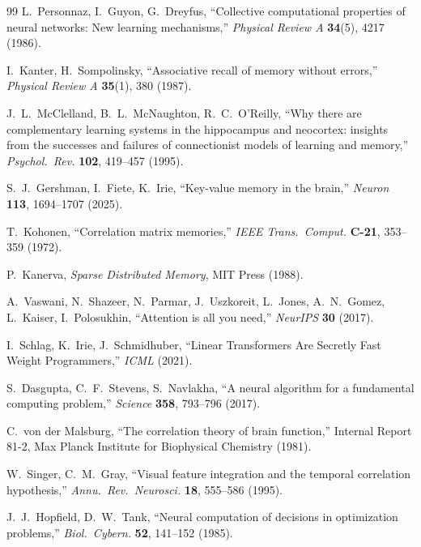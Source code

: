 \documentclass[11pt]{article}
\begin{document}
\begin{thebibliography}{99}
 L.~Personnaz, I.~Guyon, G.~Dreyfus, ``Collective computational
properties of neural networks: New learning mechanisms,'' \textit{Physical Review A}
\textbf{34}(5), 4217 (1986).

 I.~Kanter, H.~Sompolinsky, ``Associative recall of memory without
errors,'' \textit{Physical Review A} \textbf{35}(1), 380 (1987).

 J.~L.~McClelland, B.~L.~McNaughton, R.~C.~O'Reilly, ``Why there are
complementary learning systems in the hippocampus and neocortex: insights from the successes
and failures of connectionist models of learning and memory,'' \textit{Psychol.\ Rev.}
\textbf{102}, 419--457 (1995).

 S.~J.~Gershman, I.~Fiete, K.~Irie, ``Key-value memory in the brain,''
\textit{Neuron} \textbf{113}, 1694--1707 (2025).

 T.~Kohonen, ``Correlation matrix memories,'' \textit{IEEE Trans.\
Comput.} \textbf{C-21}, 353--359 (1972).

 P.~Kanerva, \textit{Sparse Distributed Memory}, MIT Press (1988).

 A.~Vaswani, N.~Shazeer, N.~Parmar, J.~Uszkoreit, L.~Jones,
A.~N.~Gomez, L.~Kaiser, I.~Polosukhin, ``Attention is all you need,'' \textit{NeurIPS}
\textbf{30} (2017).

 I.~Schlag, K.~Irie, J.~Schmidhuber, ``Linear Transformers Are Secretly
Fast Weight Programmers,'' \textit{ICML} (2021).

 S.~Dasgupta, C.~F.~Stevens, S.~Navlakha, ``A neural algorithm for a
fundamental computing problem,'' \textit{Science} \textbf{358}, 793--796 (2017).

 C.~von der Malsburg, ``The correlation theory of brain function,''
Internal Report 81-2, Max Planck Institute for Biophysical Chemistry (1981).

 W.~Singer, C.~M.~Gray, ``Visual feature integration and the temporal
correlation hypothesis,'' \textit{Annu.\ Rev.\ Neurosci.} \textbf{18}, 555--586 (1995).

 J.~J.~Hopfield, D.~W.~Tank, ``Neural computation of decisions in
optimization problems,'' \textit{Biol.\ Cybern.} \textbf{52}, 141--152 (1985).

\end{thebibliography}
\end{document}
